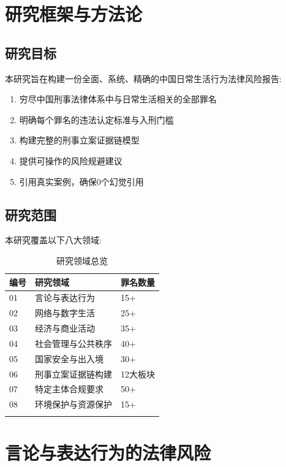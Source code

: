 \documentclass[12pt,a4paper]{article}
\begin{document}
\clearpage

\tableofcontents
\clearpage

\section{研究框架与方法论}

\subsection{研究目标}
本研究旨在构建一份全面、系统、精确的中国日常生活行为法律风险报告:

\begin{enumerate}
  \item 穷尽中国刑事法律体系中与日常生活相关的全部罪名
  \item 明确每个罪名的违法认定标准与入刑门槛
  \item 构建完整的刑事立案证据链模型
  \item 提供可操作的风险规避建议
  \item 引用真实案例，确保0个幻觉引用
\end{enumerate}

\subsection{研究范围}
本研究覆盖以下八大领域:

\begin{longtable}{p{2cm}p{10cm}p{2cm}}
  \toprule
  \textbf{编号} & \textbf{研究领域} & \textbf{罪名数量} \\
  \midrule
  01 & 言论与表达行为 & 15+ \\
  02 & 网络与数字生活 & 25+ \\
  03 & 经济与商业活动 & 35+ \\
  04 & 社会管理与公共秩序 & 40+ \\
  05 & 国家安全与出入境 & 30+ \\
  06 & 刑事立案证据链构建 & 12大板块 \\
  07 & 特定主体合规要求 & 50+ \\
  08 & 环境保护与资源保护 & 15+ \\
  \bottomrule
  \caption{研究领域总览}
\end{longtable}

\clearpage

\section{言论与表达行为的法律风险}
\end{document}
